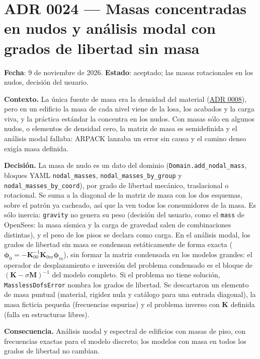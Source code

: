 \documentclass[11pt,oneside]{report}
\begin{document}
\section{ADR 0024 --- Masas concentradas en nudos y análisis modal con grados de libertad sin masa}
\label{adr:0024}

\textbf{Fecha}: 9 de noviembre de 2026. \textbf{Estado}: aceptado; las masas rotacionales en los nudos, decisión del usuario.

\textbf{Contexto.} La única fuente de masa era la densidad del material (\hyperref[adr:0008]{ADR 0008}), pero en un edificio la masa de cada nivel viene de la losa, los acabados y la carga viva, y la práctica estándar la concentra en los nudos. Con masas sólo en algunos nudos, o elementos de densidad cero, la matriz de masa es semidefinida y el análisis modal fallaba: ARPACK lanzaba un error sin causa y el camino denso exigía masa definida.

\textbf{Decisión.} La masa de nudo es un dato del dominio (\texttt{Domain.\allowbreak{}add\_\allowbreak{}nodal\_\allowbreak{}mass}, bloques YAML \texttt{nodal\_masses}, \texttt{nodal\_\allowbreak{}masses\_\allowbreak{}by\_\allowbreak{}group} y \texttt{nodal\_\allowbreak{}masses\_\allowbreak{}by\_\allowbreak{}coord}), por grado de libertad mecánico, traslacional o rotacional. Se suma a la diagonal de la matriz de masa con los dos esquemas, sobre el patrón ya cacheado, así que la ven todos los consumidores de la masa. Es sólo inercia: \texttt{gravity} no genera su peso (decisión del usuario, como el \texttt{mass} de OpenSees: la masa sísmica y la carga de gravedad salen de combinaciones distintas), y el peso de los pisos se declara como carga. En el análisis modal, los grados de libertad sin masa se condensan estáticamente de forma exacta ($\boldsymbol\phi_0 = -\mathbf K_{00}^{-1}\mathbf K_{0m}\boldsymbol\phi_m$), sin formar la matriz condensada en los modelos grandes: el operador de desplazamiento e inversión del problema condensado es el bloque de $(\mathbf K - \sigma\mathbf M)^{-1}$ del modelo completo. Si el problema no tiene solución, \texttt{MasslessDofsError} nombra los grados de libertad. Se descartaron un elemento de masa puntual (material, rigidez nula y catálogo para una entrada diagonal), la masa ficticia pequeña (frecuencias espurias) y el problema inverso con $\mathbf K$ definida (falla en estructuras libres).

\textbf{Consecuencia.} Análisis modal y espectral de edificios con masas de piso, con frecuencias exactas para el modelo discreto; los modelos con masa en todos los grados de libertad no cambian.
\end{document}
